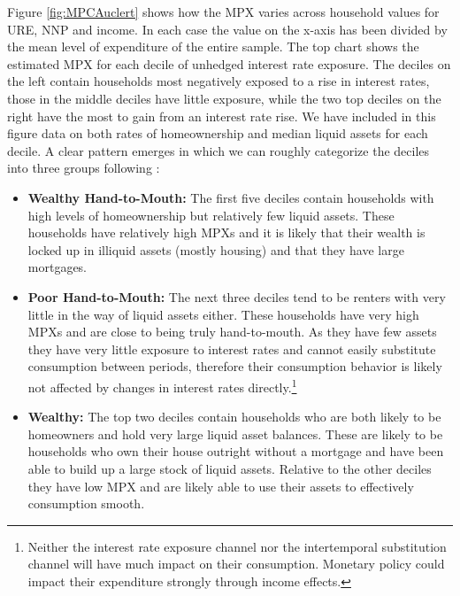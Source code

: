 \documentclass[titlepage]{\econtex}\newcommand{\texname}{ConsumptionHeterogeneity}
\begin{document}
Figure \ref{fig:MPCAuclert} shows how the MPX varies across household values for URE, NNP and income. In each case the value on the x-axis has been divided by the mean level of expenditure of the entire sample. The top chart shows the estimated MPX for each decile of unhedged interest rate exposure. The deciles on the left contain households most negatively exposed to a rise in interest rates, those in the middle deciles have little exposure, while the two top deciles on the right have the most to gain from an interest rate rise. We have included in this figure data on both rates of homeownership and median liquid assets for each decile. A clear pattern emerges in which we can roughly categorize the deciles into three groups following \cite{violante_wealthy_2014}:
\begin{itemize}
	\item \textbf{Wealthy Hand-to-Mouth:} The first five deciles contain households with high levels of homeownership but relatively few liquid assets. These households have relatively high MPXs and it is likely that their wealth is locked up in illiquid assets (mostly housing) and that they have large mortgages.
	\item \textbf{Poor Hand-to-Mouth:} The next three deciles tend to be renters with very little in the way of liquid assets either. These households have very high MPXs and are close to being truly hand-to-mouth. As they have few assets they have very little exposure to interest rates and cannot easily substitute consumption between periods, therefore their consumption behavior is likely not affected by changes in interest rates directly.\footnote{Neither the interest rate exposure channel nor the intertemporal substitution channel will have much impact on their consumption. Monetary policy could impact their expenditure strongly through income effects.}
	\item \textbf{Wealthy:} The top two deciles contain households who are both likely to be homeowners and hold very large liquid asset balances. These are likely to be households who own their house outright without a mortgage and have been able to build up a large stock of liquid assets. Relative to the other deciles they have low MPX and are likely able to use their assets to effectively consumption smooth.
\end{itemize}
\end{document}
